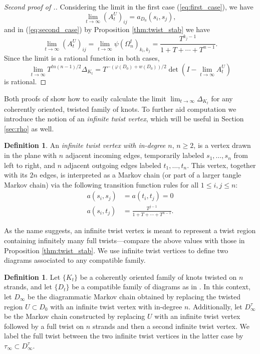 \documentclass[11pt,hyp,]{nyjm}
\numberwithin{thm}{section}
\theoremstyle{definition}
\newtheorem{defn}[thm]{Definition}
\theoremstyle{remark}
\begin{document}
\begin{proof}[Second proof of \protect{}.]
		Considering the limit in the first case (\ref{eq:first_case}), we have
		$$
		\lim_{t \to \infty} (A^U_t)_{ij} = a_{D_0}(s_i,s_j),
		$$
		and in (\ref{eq:second_case}) by Proposition \ref{thm:twist_stab} we have
		$$
		\lim_{t \to \infty} (A^U_t)_{ij} = \lim_{t \to \infty} \psi(\Omega_n^t)_{k_i,k_j} = \frac{T^{k_j - 1}}{1 + T + \cdots + T^{n - 1}}.
		$$
		Since the limit is a rational function in both cases,
		\begin{equation}
			\label{eq:last_alex}
			\lim_{t \to \infty}T^{tn(n - 1)/2} \Delta_{K_t} = T^{-(\varphi(D_0) + w(D_0))/2}\det(I - \lim_{t \to \infty} A^U_t)
		\end{equation}
		is rational.
	\end{proof}

	Both proofs of  show how to easily calculate the limit $\lim_{t \to \infty} \Delta_{K_t}$ for any coherently oriented, twisted family of knots. To further aid computation we introduce the notion of an {\em infinite twist vertex}, which will be useful in Section \ref{sec:rho} as well.
	
	\begin{defn}
		\label{def:twist_vert}
		An {\em infinite twist vertex with in-degree $n$}, $n \geq 2$, is a vertex drawn in the plane with $n$ adjacent incoming edges, temporarily labeled $s_1, \dots, s_n$ from left to right, and $n$ adjacent outgoing edges labeled $t_1, \dots, t_n$. This vertex, together with its $2n$ edges, is interpreted as a Markov chain (or part of a larger tangle Markov chain) via the following transition function rules for all $1 \leq i,j \leq n$:
		\begin{align*}
			a(s_i,s_j) &= a(t_i,t_j) = 0 \\
			a(s_i, t_j) &= \frac{T^{j - 1}}{1 + T + \cdots + T^{n - 1}}.
		\end{align*}
	\end{defn}
	As the name suggests, an infinite twist vertex is meant to represent a twist region containing infinitely many full twists---compare the above values with those in Proposition \ref{thm:twist_stab}. We use infinite twist vertices to define two diagrams associated to any compatible family.
	
	\begin{defn}
		\label{def:spec_diags}
		Let $\{K_t\}$ be a coherently oriented family of knots twisted on $n$ strands, and let $\{D_t\}$ be a compatible family of diagrams as in . In this context, let $D_\infty$ be the diagrammatic Markov chain obtained by replacing the twisted region $U \subset D_0$ with an infinite twist vertex with in-degree $n$. Additionally, let $D^\tau_\infty$ be the Markov chain constructed by replacing $U$ with an infinite twist vertex followed by a full twist on $n$ strands and then a second infinite twist vertex. We label the full twist between the two infinite twist vertices in the latter case by $\tau_\infty \subset D^\tau_\infty$.
	\end{defn}
\end{document}
